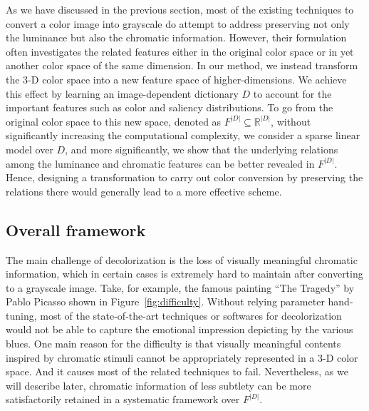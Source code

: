 As we have discussed in the previous section, 
most of the existing techniques to convert a color image 
into grayscale do attempt to address preserving not only the luminance 
but also the chromatic information. 
However, their formulation often investigates the related features 
either in the original color space or 
in yet another color space of the same dimension. 
In our method, we instead transform the 3-D color space 
into a new feature space of higher-dimensions. 
We achieve this effect by learning an image-dependent dictionary $D$
to account for the important features such as color and saliency distributions.
To go from the original color space to this new space, 
denoted as $F^{|D|} \subseteq \mathbb{R}^{|D|}$, 
without significantly increasing the computational complexity,
we consider a sparse linear model \cite{Seeger08:BIO} over $D$,
and more significantly, 
we show that the underlying relations among the luminance and chromatic features
can be better revealed in $F^{|D|}$. 
Hence, designing a transformation to carry out color conversion 
by preserving the relations there would generally lead to a more effective scheme.

%
\subsection{Overall framework}
\label{sec:framework}
%

The main challenge of decolorization is the loss of visually
meaningful chromatic information, which in certain cases is extremely hard
to maintain after converting to a grayscale image. 
Take, for example, the famous painting ``The Tragedy'' by Pablo Picasso 
shown in Figure~\ref{fig:difficulty}. Without relying parameter hand-tuning,
most of the state-of-the-art techniques or softwares for decolorization 
would not be able to capture the emotional impression depicting by the various blues.
One main reason for the difficulty is that visually meaningful contents
inspired by chromatic stimuli cannot be appropriately represented in a 3-D color space.
And it causes most of the related techniques to fail. 
Nevertheless, as we will describe later, chromatic information of less subtlety
can be more satisfactorily retained in a systematic framework over $F^{|D|}$.


